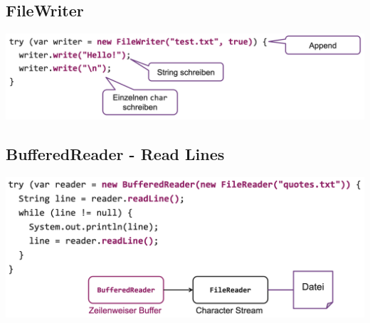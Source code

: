 \documentclass[a4paper, landscape, 8pt]{scrartcl}
\begin{document}
\begin{multicols*}{4}
            \subsection{FileWriter}
                \includegraphics[scale=0.15]{graphic/20_file_writer}
            \subsection{BufferedReader - Read Lines}
                \includegraphics[scale=0.15]{graphic/21_bufferedreader_line}

    \end{multicols*}
\end{document}
